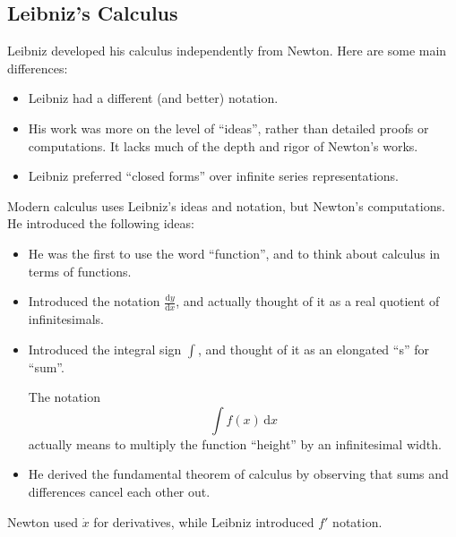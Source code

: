\documentclass[class=article, crop=false]{standalone}
\begin{document}
  \subsection{Leibniz's Calculus}
  Leibniz developed his calculus independently from Newton. Here are some main differences:
  \begin{itemize}
    \item Leibniz had a different (and better) notation.
    \item His work was more on the level of ``ideas'', rather than detailed proofs or computations. It lacks much of the depth and rigor of Newton's works.
    \item Leibniz preferred ``closed forms'' over infinite series representations.
  \end{itemize}
  Modern calculus uses Leibniz's ideas and notation, but Newton's computations. He introduced the following ideas:
  \begin{itemize}
    \item He was the first to use the word ``function'', and to think about calculus in terms of functions.
    \item Introduced the notation $\frac{\mathrm{d}y}{\mathrm{d}x}$, and actually thought of it as a real quotient of infinitesimals.
    \item Introduced the integral sign $\int$, and thought of it as an elongated ``s'' for ``sum''.
    \begin{note}{}
      The notation 
      \[
        \int f(x)\,\mathrm{d}x
      \]
      actually means to multiply the function ``height'' by an infinitesimal width.
    \end{note}
    \item He derived the fundamental theorem of calculus by observing that sums and differences cancel each other out.
  \end{itemize}
  Newton used $\dot{x}$ for derivatives, while Leibniz introduced $f'$ notation.
\end{document}
